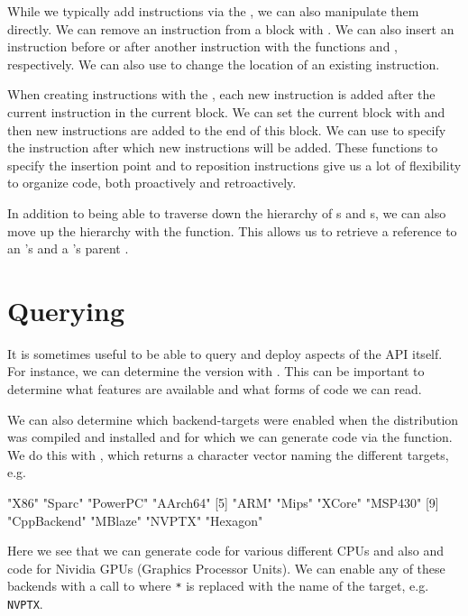 \documentclass[article]{jss}
\begin{document}
While we typically add instructions via the , we can
also manipulate them directly.  We can remove an instruction from a
block with .  We can also insert an instruction
before or after another instruction with the functions
 and , respectively.  We can
also use  to change the location of an existing
instruction.

When creating instructions with the , each new
instruction is added after the current instruction in the current
block.  We can set the current block with  and
then new instructions are added to the end of this block.  We can use
 to specify the instruction after which new
instructions will be added.  These functions to specify the insertion
point and to reposition instructions give us a lot of flexibility to
organize code, both proactively and retroactively.


In addition to being able to traverse down the hierarchy of
s and s, we can also move up
the hierarchy with the  function.  This allows us to
retrieve a reference to an 's 
and a 's parent .



\section[Querying LLVM]{Querying \llvm}
It is sometimes useful to be able to query and deploy aspects of the
\llvm{} API itself.  For instance, we can determine the version with
.  This can be important to determine what features
are available and what forms of code we can read.


We can also determine which backend-targets were enabled
when the \llvm{} distribution was compiled and installed
and for which we can generate  code via the 
function.
We do this with , which returns 
a character vector naming the different targets, e.g.
\begin{ROutput}
 [1] "X86"        "Sparc"      "PowerPC"    "AArch64"   
 [5] "ARM"        "Mips"       "XCore"      "MSP430"    
 [9] "CppBackend" "MBlaze"     "NVPTX"      "Hexagon"  
\end{ROutput}
Here we see that we can generate code for various different CPUs
and also \Cpp{} and  code for  Nividia GPUs (Graphics
Processor Units).
We can enable any of these backends with a call to 
 where \texttt{*} is replaced
with the name of the target, e.g. \texttt{NVPTX}.
\end{document}
